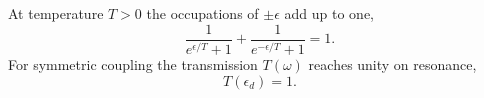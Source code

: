 \documentclass{article}
\begin{document}
At temperature $T>0$ the occupations of $\pm\epsilon$ add up to one,
\begin{equation}
\frac{1}{e^{\epsilon/T}+1} + \frac{1}{e^{-\epsilon/T}+1} = 1 .
\label{eq:ph}
\end{equation}
For symmetric coupling the transmission $T(\omega)$ reaches unity on resonance,
\begin{equation}
T(\epsilon_d) = 1 .
\label{eq:res}
\end{equation}
\end{document}
